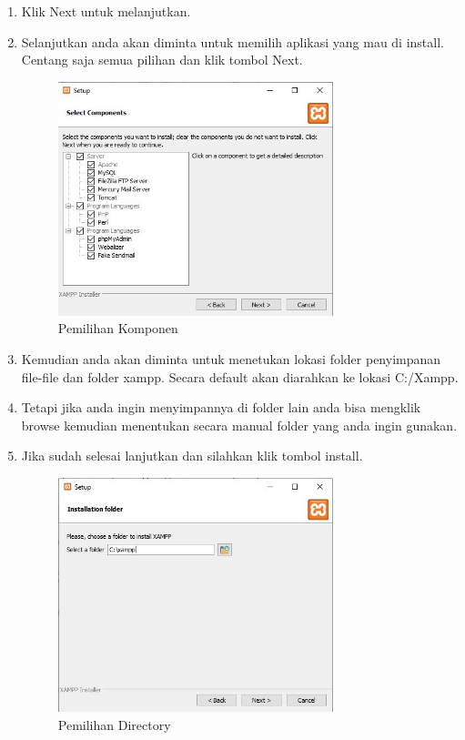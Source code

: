\begin{enumerate}
\item Klik Next untuk melanjutkan.	
\item Selanjutkan anda akan diminta untuk memilih aplikasi yang mau di install. Centang saja semua pilihan dan klik tombol Next.
	\begin{figure}[H]
		\includegraphics[width=8cm]{figures/instalasi/xampp4.jpg}
		\centering
		\caption{Pemilihan Komponen}
	\end{figure}
	
\item Kemudian anda akan diminta untuk menetukan lokasi folder penyimpanan file-file dan folder xampp. Secara default akan diarahkan ke lokasi  C:/Xampp.

\item Tetapi jika anda ingin menyimpannya di folder lain anda bisa mengklik browse kemudian menentukan secara manual folder yang anda ingin gunakan.
	
\item Jika sudah selesai lanjutkan dan silahkan klik tombol install.
	\begin{figure}[H]
		\includegraphics[width=8cm]{figures/instalasi/xampp5.jpg}
		\centering
		\caption{Pemilihan Directory}
	\end{figure}
	

\end{enumerate}
